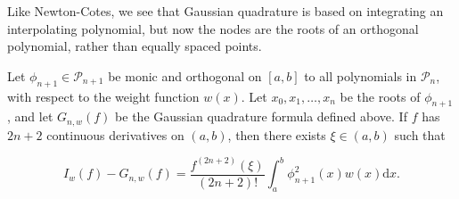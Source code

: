 \begin{remark}
  Like Newton-Cotes, we see that Gaussian quadrature is based on integrating an interpolating polynomial, but now the nodes are the roots of an orthogonal polynomial, rather than equally spaced points.
\end{remark}

\begin{theorem}
  Let \(\phi_{n+1} \in \mathcal{P}_{n+1}\) be monic and orthogonal on \([a, b]\) to all polynomials in \(\mathcal{P}_n\), with respect to the weight function \(w(x)\). Let \(x_0, x_1, \ldots, x_n\) be the roots of \(\phi_{n+1}\), and let \(G_{n, w}(f)\) be the Gaussian quadrature formula defined above. If \(f\) has \(2 n+2\) continuous derivatives on \((a, b)\), then there exists \(\xi \in(a, b)\) such that

\[
I_w(f)-G_{n, w}(f)=\frac{f^{(2 n+2)}(\xi)}{(2 n+2)!} \int_a^b \phi_{n+1}^2(x) w(x) \mathrm{d} x .
\]
\end{theorem}
